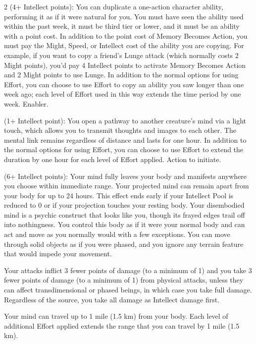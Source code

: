 \begin{multicols}{2}
 (4+ Intellect points): You can duplicate a one-action character ability, performing it as if it were natural for you. You must have seen the ability used within the past week, it must be third tier or lower, and it must be an ability with a point cost. In addition to the point cost of Memory Becomes Action, you must pay the Might, Speed, or Intellect cost of the ability you are copying. For example, if you want to copy a friend’s Lunge attack (which normally costs 2 Might points), you’d pay 4 Intellect points to activate Memory Becomes Action and 2 Might points to use Lunge. In addition to the normal options for using Effort, you can choose to use Effort to copy an ability you saw longer than one week ago; each level of Effort used in this way extends the time period by one week. 
Enabler. 
 
 (1+ Intellect point): You open a pathway to another creature’s mind via a light touch, which allows you to transmit thoughts and images to each other. The mental link remains regardless of distance and lasts for one hour. In addition to the normal options for using Effort, you can choose to use Effort to extend the duration by one hour for each level of Effort applied. Action to initiate. 
 
 (6+ Intellect points): Your mind fully leaves your body and manifests anywhere you choose within immediate range. Your projected mind can remain apart from your body for up to 24 hours. This effect ends early if your Intellect Pool is reduced to 0 or if your projection touches your resting body. 
Your disembodied mind is a psychic construct that looks like you, though its frayed edges trail off into nothingness. You control this body as if it were your normal body and can act and move as you normally would with a few exceptions. You can move through solid objects as if you were phased, and you ignore any terrain feature that would impede your movement. 

Your attacks inflict 3 fewer points of damage (to a minimum of 1) and you take 3 fewer points of damage (to a minimum of 1) from physical attacks, unless they can affect transdimensional or phased beings, in which case you take full damage. Regardless of the source, you take all damage as Intellect damage first. 

Your mind can travel up to 1 mile (1.5 km) from your body. Each level of additional Effort applied extends the range that you can travel by 1 mile (1.5 km). 


\end{multicols}
